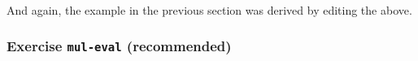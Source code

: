\begin{fence}
\begin{code}
\>[3][@{}l@{\AgdaIndent{0}}]%
\>[4]\AgdaSymbol{(}\AgdaSpace{}%
\AgdaSpace{}%
\AgdaSpace{}%
\AgdaSpace{}%
\AgdaSpace{}%
\AgdaSymbol{)}\AgdaSpace{}%
\AgdaSpace{}%
\AgdaSpace{}%
\AgdaSymbol{(}\AgdaSpace{}%
\AgdaSymbol{(}\AgdaSpace{}%
\AgdaSymbol{))}\<%
\\
%
\>[3]\AgdaSpace{}%
\AgdaSpace{}%
\AgdaSymbol{(}\AgdaSpace{}%
\AgdaSymbol{(}\AgdaSpace{}%
\AgdaSymbol{(}\AgdaSpace{}%
\AgdaSymbol{)))}\AgdaSpace{}%
\<%
\\
\>[3][@{}l@{\AgdaIndent{0}}]%
\>[4]\AgdaSpace{}%
\AgdaSymbol{(}\AgdaSpace{}%
\AgdaSymbol{(}\AgdaSpace{}%
\AgdaSymbol{(}\AgdaSpace{}%
\AgdaSymbol{)))}\<%
\\
%
\>[3]\AgdaSymbol{)}\<%
\\
%
\>[3]\AgdaSymbol{(}\AgdaSpace{}%
\AgdaSymbol{(}\AgdaSpace{}%
\AgdaSymbol{(}\AgdaSpace{}%
\AgdaSymbol{(}\AgdaSpace{}%
\AgdaSymbol{(}\AgdaSpace{}%
\AgdaSymbol{)))))}\<%
\\
\>[0]\AgdaSymbol{\AgdaUnderscore{}}\AgdaSpace{}%
\AgdaSymbol{=}\AgdaSpace{}%
\<%
\end{code}
\end{fence}

And again, the example in the previous section was derived by editing
the above.

\hypertarget{exercise-mul-eval-recommended}{%
\subsubsection{\texorpdfstring{Exercise \texttt{mul-eval}
(recommended)}{Exercise mul-eval (recommended)}}\label{exercise-mul-eval-recommended}}


